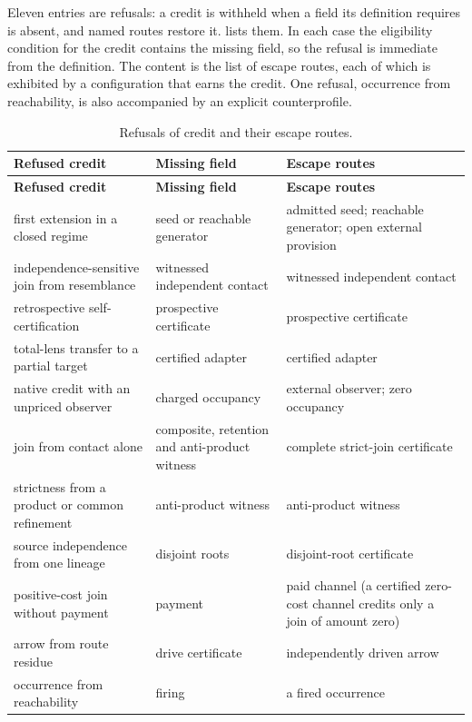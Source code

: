 Eleven entries are refusals: a credit is withheld when a field its definition requires is
absent, and named routes restore it.  lists them. In each case the
eligibility condition for the credit contains the missing field, so the refusal is
immediate from the definition. The content is the list of escape routes, each of which is
exhibited by a configuration that earns the credit. One refusal, occurrence from
reachability, is also accompanied by an explicit counterprofile.

{\small
\begin{longtable}{@{}>{\raggedright\arraybackslash}p{4.4cm}>{\raggedright\arraybackslash}p{5.2cm}>{\raggedright\arraybackslash}p{5.3cm}@{}}
\caption{Refusals of credit and their escape routes.}
\label{tab:refusals}\\
\toprule
\textbf{Refused credit} & \textbf{Missing field} & \textbf{Escape routes} \\
\midrule
\endfirsthead
\toprule
\textbf{Refused credit} & \textbf{Missing field} & \textbf{Escape routes} \\
\midrule
\endhead
\bottomrule
\endfoot
first extension in a closed regime & seed or reachable generator & admitted seed; reachable generator; open external provision \\
independence-sensitive join from resemblance & witnessed independent contact & witnessed independent contact \\
retrospective self-certification & prospective certificate & prospective certificate \\
total-lens transfer to a partial target & certified adapter & certified adapter \\
native credit with an unpriced observer & charged occupancy & external observer; zero occupancy \\
join from contact alone & composite, retention and anti-product witness & complete strict-join certificate \\
strictness from a product or common refinement & anti-product witness & anti-product witness \\
source independence from one lineage & disjoint roots & disjoint-root certificate \\
positive-cost join without payment & payment & paid channel (a certified zero-cost channel credits only a join of amount zero) \\
arrow from route residue & drive certificate & independently driven arrow \\
occurrence from reachability & firing & a fired occurrence \\
\end{longtable}
}

